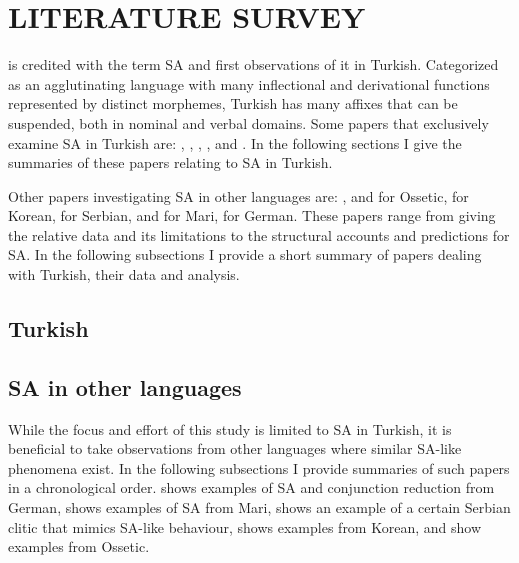 \chapter{\MakeUppercase{Literature Survey}} \label{litsurvey}
\setcounter{exx}{0}

\cite{geoffrey1967turkish} is credited with the term SA and first observations of it in Turkish. Categorized as an agglutinating language with many inflectional and derivational functions represented by distinct morphemes, Turkish has many affixes that can be suspended, both in nominal and verbal domains. Some papers that exclusively examine SA in Turkish are: \cite{orgun1995flat}, \cite{kabak2007turkish}, \cite{broadwell2008turkish}, \cite{kornfilt2012revisiting}, and \cite{kharytonava2012word,kharytonava2012taming}. In the following sections I give the summaries of these papers relating to SA in Turkish.

Other papers investigating SA in other languages are: \cite{erschler2012suspended}, and \cite{erschler2018suspended} for Ossetic, \cite{yoon2017lexical} for Korean, \cite{despic2017suspended} for Serbian, and \cite{guseva2017postsyntactic} for Mari, \cite{pounder2006broken} for German. These papers range from giving the relative data and its limitations to the structural accounts and predictions for SA. In the following subsections I provide a short summary of papers dealing with Turkish, their data and analysis.

\section{Turkish}















\section{SA in other languages}

While the focus and effort of this study is limited to SA in Turkish, it is beneficial to take observations from other languages where similar SA-like phenomena exist. In the following subsections I provide summaries of such papers in a chronological order. \cite{pounder2006broken} shows examples of SA and conjunction reduction from German, \cite{guseva2017postsyntactic} shows examples of SA from Mari, \cite{despic2017suspended} shows an example of a certain Serbian clitic that mimics SA-like behaviour, \cite{yoon2017lexical} shows examples from Korean, and \cite{erschler2012suspended,erschler2018suspended} show examples from Ossetic.











